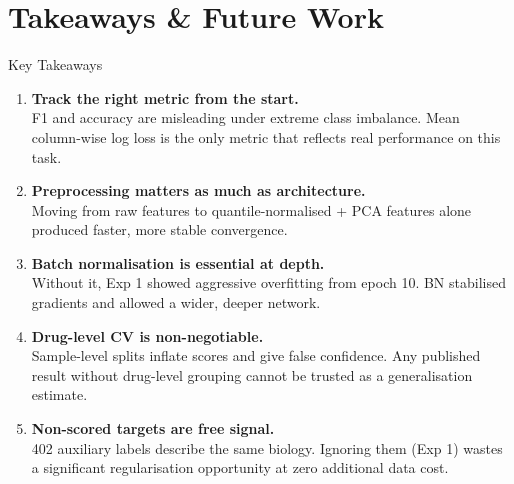 \documentclass[aspectratio=169, 10pt]{beamer}
\begin{document}
\section{Takeaways \& Future Work}

\begin{frame}{Key Takeaways}
  \begin{enumerate}
    \setlength\itemsep{0.5em}
    \item \textbf{Track the right metric from the start.}\\
          F1 and accuracy are misleading under extreme class imbalance.
          Mean column-wise log loss is the only metric that reflects
          real performance on this task.

    \item \textbf{Preprocessing matters as much as architecture.}\\
          Moving from raw features to quantile-normalised + PCA features
          alone produced faster, more stable convergence.

    \item \textbf{Batch normalisation is essential at depth.}\\
          Without it, Exp 1 showed aggressive overfitting from epoch 10.
          BN stabilised gradients and allowed a wider, deeper network.

    \item \textbf{Drug-level CV is non-negotiable.}\\
          Sample-level splits inflate scores and give false confidence.
          Any published result without drug-level grouping cannot be
          trusted as a generalisation estimate.

    \item \textbf{Non-scored targets are free signal.}\\
          402 auxiliary labels describe the same biology.
          Ignoring them (Exp 1) wastes a significant regularisation
          opportunity at zero additional data cost.
  \end{enumerate}
\end{frame}
\end{document}
